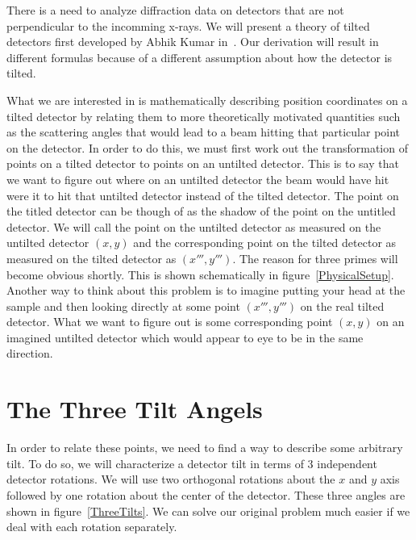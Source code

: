 There is a need to analyze diffraction data on detectors that are 
not perpendicular to the incomming x-rays. We will present a 
theory of tilted detectors first developed by Abhik Kumar 
in~\cite{Kumar05}. Our derivation will result in 
different formulas because of a different assumption
about how the detector is tilted. 

What we are interested in is mathematically describing 
position coordinates on a tilted detector by relating 
them to more theoretically motivated quantities such as 
the scattering angles that would lead to a beam hitting
that particular point on the detector. 
In order to do this, we must first work
out the transformation of points on a tilted detector
to points on an untilted detector. This is to say
that we want to figure out where on an untilted 
detector the beam would have hit were it to hit
that untilted detector instead of the tilted detector.
The point on the titled detector can be though of
as the shadow of the point on the untitled detector.
We will call the point on the untilted detector
as measured on the untilted detector $(x,y)$ 
and the corresponding point on the tilted detector
as measured on the tilted detector as $(x''',y''')$. 
The reason for three primes will become obvious
shortly. This is shown schematically in 
figure~\ref{PhysicalSetup}. Another way to think
about this problem is to imagine putting your 
head at the sample and then looking directly 
at some point $(x''',y''')$ on the real
tilted detector. What we want to figure out
is some corresponding point $(x,y)$ on an 
imagined untilted 
detector which would appear to eye to be 
in the same direction.

\begin{SCfigure}[1][htbp]
    \centering
    
    \caption{Here, the detector 
    is titled by some arbitrary angle with respect to the 
    incoming beam. We will call some arbitrary point on 
    the tilted detector $(x''',y''')$. We are interested in 
    relating this point to the point $(x,y)$ on some imagined 
    untilted detector where a scattered beam would have hit 
    were that tilted detector in place instead of the tilted
    detector.}
    \label{PhysicalSetup}
\end{SCfigure}

\section{The Three Tilt Angels}
\index{$\alpha$} \index{$\beta$}  
In order to relate these points, we need to find a way to 
describe some arbitrary tilt. To do so, we will 
characterize a detector tilt in terms of
3 independent detector rotations. We will use
two orthogonal rotations about the $x$ and $y$ axis 
followed by one rotation about the center of the detector.
These three angles are shown in figure~\ref{ThreeTilts}.
We can solve our original problem much easier if we deal
with each rotation separately.

